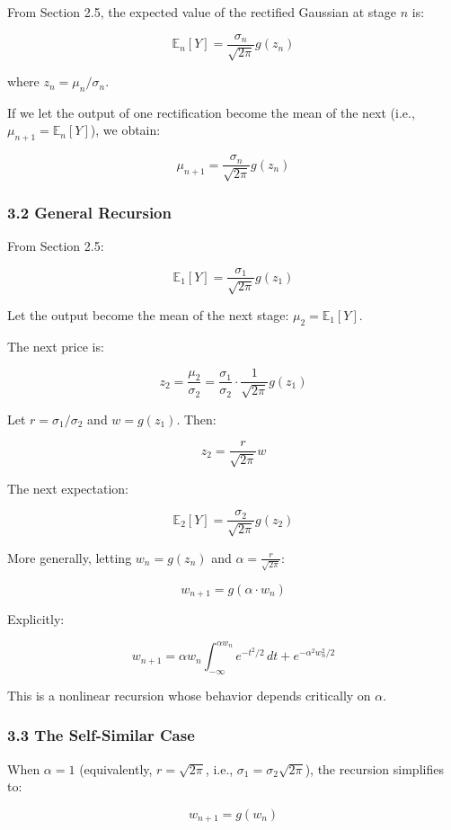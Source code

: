 \documentclass[
  11pt,
  openany]{article}
\begin{document}
From Section 2.5, the expected value of the rectified Gaussian at stage
\(n\) is:

\[\mathbb{E}_n[Y] = \frac{\sigma_n}{\sqrt{2\pi}} g(z_n)\]

where \(z_n = \mu_n/\sigma_n\).

If we let the output of one rectification become the mean of the next
(i.e., \(\mu_{n+1} = \mathbb{E}_n[Y]\)), we obtain:

\[\mu_{n+1} = \frac{\sigma_n}{\sqrt{2\pi}} g(z_n)\]

\subsubsection{3.2 General Recursion}\label{general-recursion}

From Section 2.5:

\[\mathbb{E}_1[Y] = \frac{\sigma_1}{\sqrt{2\pi}} g(z_1)\]

Let the output become the mean of the next stage:
\(\mu_2 = \mathbb{E}_1[Y]\).

The next price is:

\[z_2 = \frac{\mu_2}{\sigma_2} = \frac{\sigma_1}{\sigma_2} \cdot \frac{1}{\sqrt{2\pi}} g(z_1)\]

Let \(r = \sigma_1/\sigma_2\) and \(w = g(z_1)\). Then:

\[z_2 = \frac{r}{\sqrt{2\pi}} w\]

The next expectation:

\[\mathbb{E}_2[Y] = \frac{\sigma_2}{\sqrt{2\pi}} g(z_2)\]

More generally, letting \(w_n = g(z_n)\) and
\(\alpha = \frac{r}{\sqrt{2\pi}}\):

\[w_{n+1} = g(\alpha \cdot w_n)\]

Explicitly:

\[w_{n+1} = \alpha w_n \int_{-\infty}^{\alpha w_n} e^{-t^2/2} \, dt + e^{-\alpha^2 w_n^2/2}\]

This is a nonlinear recursion whose behavior depends critically on
\(\alpha\).

\subsubsection{3.3 The Self-Similar Case}\label{the-self-similar-case}

When \(\alpha = 1\) (equivalently, \(r = \sqrt{2\pi}\), i.e.,
\(\sigma_1 = \sigma_2 \sqrt{2\pi}\)), the recursion simplifies to:

\[w_{n+1} = g(w_n)\]
\end{document}
